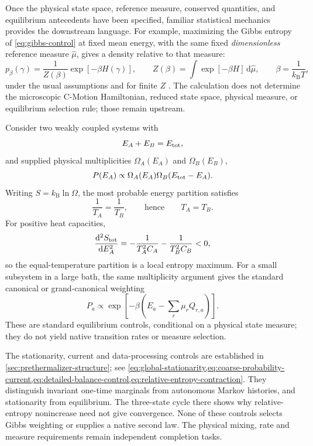 \documentclass[11pt]{article}
\theoremstyle{definition}
\newcommand{\cmotion}{\mbox{C-Motion}}
\newcommand{\dd}{\mathrm{d}}
\newcommand{\kb}{k_{\mathrm B}}
\begin{document}
Once the physical state space, reference measure, conserved quantities, and
equilibrium antecedents have been specified, familiar statistical mechanics
provides the downstream language.  For example, maximizing the Gibbs entropy
of \cref{eq:gibbs-control} at fixed mean energy, with the same fixed
\emph{dimensionless} reference measure $\widehat\mu$, gives a density relative
to that measure:
\begin{equation}
  p_\beta(\gamma)
  =\frac{1}{Z(\beta)}\exp[-\beta H(\gamma)],
  \qquad
  Z(\beta)=\int\exp[-\beta H] \,\dd\widehat\mu,
  \qquad
  \beta=\frac{1}{\kb T},
  \label{eq:canonical-control}
\end{equation}
under the usual assumptions and for finite $Z$ \cite{Jaynes1957}.  The calculation does not determine the
microscopic \cmotion{} Hamiltonian, reduced state space, physical measure, or equilibrium
selection rule; those remain upstream.


Consider two weakly coupled systems with
\begin{equation}
  E_A+E_B=E_{\rm tot},
\end{equation}
and supplied physical multiplicities $\Omega_A(E_A)$ and $\Omega_B(E_B)$,
\begin{equation}
  P(E_A)\propto\Omega_A(E_A)\Omega_B(E_{\rm tot}-E_A).
  \label{eq:two-bath-weight}
\end{equation}
Writing $S=\kb\ln\Omega$, the most probable energy partition satisfies
\begin{equation}
  \frac{1}{T_A}=\frac{1}{T_B},
  \qquad\text{hence}\qquad
  \boxed{T_A=T_B}.
  \label{eq:equal-temperature-control}
\end{equation}
For positive heat capacities,
\begin{equation}
  \frac{\dd^2S_{\rm tot}}{\dd E_A^2}
  =-\frac{1}{T_A^2C_A}-\frac{1}{T_B^2C_B}<0,
  \label{eq:two-bath-stability}
\end{equation}
so the equal-temperature partition is a local entropy maximum.  For a small subsystem in a
large bath, the same multiplicity argument gives the standard canonical or grand-canonical
weighting
\begin{equation}
  P_a\propto
  \exp\!\left[-\beta\left(E_a-\sum_r\mu_rQ_{r,a}\right)\right].
  \label{eq:bath-canonical-control}
\end{equation}
These are standard equilibrium controls, conditional on a physical state measure;
they do not yield native transition rates or measure selection.

The stationarity, current and data-processing controls are established in
\cref{sec:prethermalizer-structure}; see
\cref{eq:global-stationarity,eq:coarse-probability-current,eq:detailed-balance-control,eq:relative-entropy-contraction}.
They distinguish invariant one-time marginals from autonomous Markov histories,
and stationarity from equilibrium. The three-state cycle there shows why
relative-entropy nonincrease need not give convergence. None of these controls
selects Gibbs weighting or supplies a native second law. The physical mixing,
rate and measure requirements remain independent completion tasks.
\end{document}
